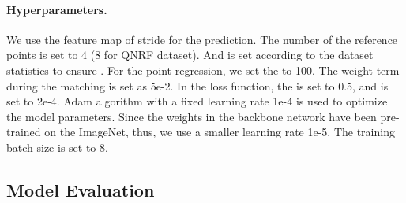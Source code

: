\documentclass[10pt,twocolumn,letterpaper]{article}
\begin{document}
\paragraph{Hyperparameters.} We use the feature map of stride  for the prediction. The number  of the reference points is set to 4 (8 for QNRF dataset). And  is set according to the dataset statistics to ensure . For the point regression, we set the  to 100. The weight term  during the matching is set as 5e-2. In the loss function, the  is set to 0.5, and  is set to 2e-4. Adam algorithm \cite{kingma2014adam} with a fixed learning rate 1e-4 is used to optimize the model parameters. Since the weights in the backbone network have been pre-trained on the ImageNet, thus, we use a smaller learning rate 1e-5. The training batch size is set to 8.

\subsection{Model Evaluation}
\begin{table*}[ht!]
    \vspace{-0.5em}
    \centering
    \small{
    }\vspace{0.2em}
    \caption{The overall performance of our P2PNet.}
    \label{tab:loc}
    \vspace{-0.4em}
\end{table*}
\end{document}
